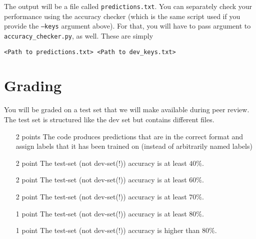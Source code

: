 \documentclass[11pt, leqno, a4paper]{article}
\begin{document}
The output will be a file called \texttt{predictions.txt}. You can separately check your performance using the
accuracy checker (which is the same script used if you provide the \texttt{--keys} argument above). 
For that, you will have to pass argument to \texttt{accuracy\_checker.py}, as well. These
are simply
\begin{center}
\texttt{<Path to predictions.txt> <Path to dev\_keys.txt>}
\end{center} 

\section{Grading}
You will be graded on a test set that we will make available during peer review. The test set
is structured like the dev set but contains different files.
\begin{itemize}
\item[2 points] The code produces predictions that are in the correct format and assign labels that
it has been trained on (instead of arbitrarily named labels)
\item[2 point] The test-set (not dev-set(!)) accuracy is at least $ 40\% $.
\item[2 point] The test-set (not dev-set(!)) accuracy is at least $ 60\% $.
\item[2 point] The test-set (not dev-set(!)) accuracy is at least $ 70\% $.
\item[1 point] The test-set (not dev-set(!)) accuracy is at least $ 80\% $.
\item[1 point] The test-set (not dev-set(!)) accuracy is higher than $ 80\% $.
\end{itemize}
\end{document}
